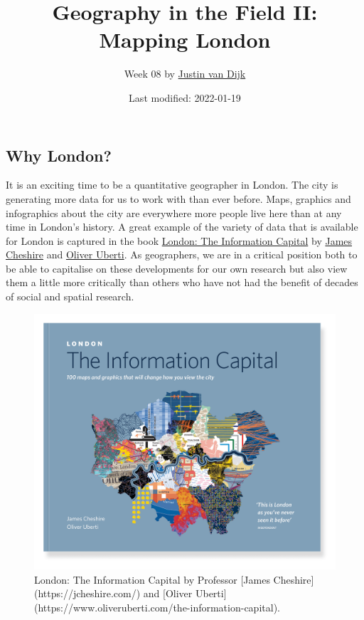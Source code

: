 \documentclass[
]{book}
\title{Geography in the Field II: Mapping London}
\author{Week 08 by \href{https://mappingdutchman.com/}{Justin van Dijk}}
\date{Last modified: 2022-01-19}
\begin{document}
\maketitle

{
\setcounter{tocdepth}{1}
\tableofcontents
}
\hypertarget{section}{%
\chapter*{}\label{section}}

\hypertarget{why-london}{%
\section*{Why London?}\label{why-london}}

It is an exciting time to be a quantitative geographer in London. The city is generating more data for us to work with than ever before. Maps, graphics and infographics about the city are everywhere more people live here than at any time in London's history. A great example of the variety of data that is available for London is captured in the book \href{https://www.oliveruberti.com/the-information-capital}{London: The Information Capital} by \href{https://jcheshire.com/}{James Cheshire} and \href{https://www.oliveruberti.com/}{Oliver Uberti}. As geographers, we are in a critical position both to be able to capitalise on these developments for our own research but also view them a little more critically than others who have not had the benefit of decades of social and spatial research.

\begin{figure}

{\centering \includegraphics[width=500pt]{images/w08/information_capital} 

}

\caption{London: The Information Capital by Professor [James Cheshire](https://jcheshire.com/) and [Oliver Uberti](https://www.oliveruberti.com/the-information-capital).}\label{fig:london-information-capital}
\end{figure}
\end{document}
